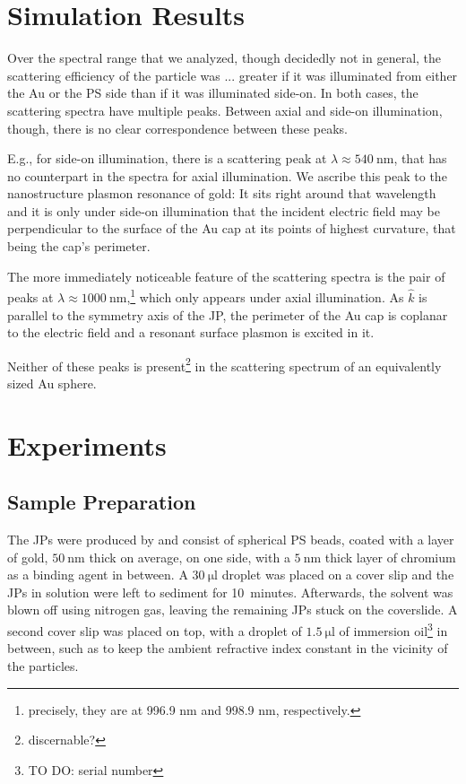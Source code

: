 \documentclass[10pt]{article}
\begin{document}
\begin{multicols}{2}
\section*{Simulation Results}



Over the spectral range that we analyzed, though decidedly not in general, the scattering efficiency of the particle was ... greater if it was illuminated from either the Au or the PS side than if it was illuminated side-on. 
In both cases, the scattering spectra have multiple peaks. 
Between axial and side-on illumination, though, there is no clear correspondence between these peaks. 

E.g., for side-on illumination, there is a scattering peak at $\lambda\approx\SI{540}{\nano\meter}$, that has no counterpart in the spectra for axial illumination. 
We ascribe this peak to the nanostructure plasmon resonance of gold: 
It sits right around that wavelength and it is only under side-on illumination that the incident electric field may be perpendicular to the surface of the Au cap at its points of highest curvature, that being the cap's perimeter. 

The more immediately noticeable feature of the scattering spectra is the pair of peaks at $\lambda\approx\SI{1000}{\nano\meter}$,\footnote{precisely, they are at 996.9 nm and 998.9 nm, respectively.} which only appears under axial illumination. 
As $\hat{k}$ is parallel to the symmetry axis of the JP, the perimeter of the Au cap is coplanar to the electric field and a resonant surface plasmon is excited in it. 

Neither of these peaks is present\footnote{discernable?} in the scattering spectrum of an equivalently sized Au sphere. 




\section*{Experiments}

\subsection*{Sample Preparation}

The JPs were produced by  and consist of spherical PS beads, coated with a layer of gold, $\SI{50}{\nano\meter}$ thick on average, on one side, with a $\SI{5}{\nano\meter}$ thick layer of chromium as a binding agent in between. 
A $\SI{30}{\micro\litre}$ droplet was placed on a cover slip and the JPs in solution were left to sediment for \mbox{10 minutes}. 
Afterwards, the solvent was blown off using nitrogen gas, leaving the remaining JPs stuck on the coverslide. 
A second cover slip was placed on top, with a droplet of $\SI{1.5}{\micro\litre}$ of immersion oil\footnote{TO DO: serial number} in between, such as to keep the ambient refractive index constant in the vicinity of the particles.   


\end{multicols}
\end{document}
